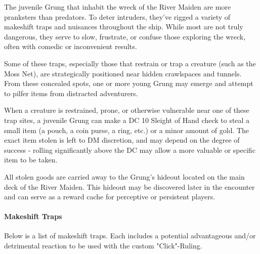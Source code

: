 {\noindent\entryfont The juvenile Grung that inhabit the wreck of the River Maiden are more pranksters than predators. To deter intruders, they've rigged a variety of makeshift traps and nuisances throughout the ship. While most are not truly dangerous, they serve to slow, frustrate, or confuse those exploring the wreck, often with comedic or inconvenient results.

Some of these traps, especially those that restrain or trap a creature (such as the Moss Net), are strategically positioned near hidden crawlspaces and tunnels. From these concealed spots, one or more young Grung may emerge and attempt to pilfer items from distracted adventurers.

When a creature is restrained, prone, or otherwise vulnerable near one of these trap sites, a juvenile Grung can make a DC 10 Sleight of Hand check to steal a small item (a pouch, a coin purse, a ring, etc.) or a minor amount of gold. The exact item stolen is left to DM discretion, and may depend on the degree of success - rolling significantly above the DC may allow a more valuable or specific item to be taken.

All stolen goods are carried away to the Grung's hideout located on the main deck of the River Maiden. This hideout may be discovered later in the encounter and can serve as a reward cache for perceptive or persistent players.}

{\entryfont\paragraph*{Makeshift Traps} Below is a list of makeshift traps. Each includes a potential advantageous and/or detrimental reaction to be used with the custom "Click"-Ruling.}

